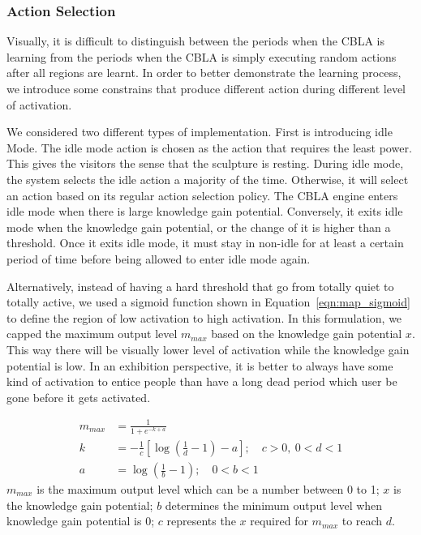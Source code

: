 \FloatBarrier 
\subsubsection{Action Selection}

Visually, it is difficult to distinguish between the periods when the CBLA is learning from the periods when the CBLA is simply executing random actions after all regions are learnt. In order to better demonstrate the learning process, we introduce some constrains that produce different action during different level of activation. 

We considered two different types of implementation. First is introducing idle Mode. The idle mode action is chosen as the action that requires the least power. This gives the visitors the sense that the sculpture is resting. During idle mode, the system selects the idle action a majority of the time. Otherwise, it will select an action based on its regular action selection policy. The CBLA engine enters idle mode when there is large knowledge gain potential. Conversely, it exits idle mode when the knowledge gain potential, or the change of it is higher than a threshold. Once it exits idle mode, it must stay in non-idle for at least a certain period of time before being allowed to enter idle mode again. 

Alternatively, instead of having a hard threshold that go from totally quiet to totally active, we used a sigmoid function shown in Equation~\eqref{eqn:map_sigmoid} to define the region of low activation to high activation. In this formulation, we capped the maximum output level $m_{max}$ based on the knowledge gain potential $x$. This way there will be visually lower level of activation while the knowledge gain potential is low. In an exhibition perspective, it is better to always have some kind of activation to entice people than have a long dead period which user be gone before it gets activated.

\begin{subequations}\label{eqn:map_sigmoid}
	\begin{flalign} 
		m_{max} &= \frac{1}{1+e^{-k+a}}  \\
		k &= -\frac{1}{c}[\log{(\frac{1}{d}-1)}-a];\quad c > 0,\  0 < d < 1 \\
		a &= \log{(\frac{1}{b}-1)}; \quad 0 < b < 1
	\end{flalign}
\end{subequations}
$m_{max}$ is the maximum output level which can be a number between 0 to 1; $x$ is the knowledge gain potential; $b$ determines the minimum output level when knowledge gain potential is 0; $c$ represents the $x$ required for $m_{max}$ to reach $d$. 

